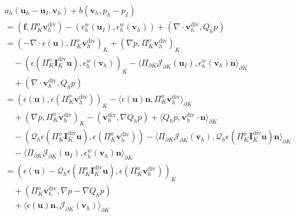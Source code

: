 \documentclass[review,hidelinks,onefignum,onetabnum]{siamart251216}
\begin{document}
\begin{equation}\label{eq:erroreq}
\begin{aligned}
& a_h(\boldsymbol{u}_h - \boldsymbol{u}_I, \boldsymbol{v}_h) + b(\boldsymbol{v}_h, p_h - p_I) \\
&= (\boldsymbol{f}, \Pi_K^o \boldsymbol{v}_h^{\operatorname{div}}) 
  - (\epsilon_h^w(\boldsymbol{u}_I), \epsilon_h^w(\boldsymbol{v}_h)) 
  + (\nabla \cdot \boldsymbol{v}_h^{\operatorname{div}}, Q_h p) \\
&= (-\nabla \cdot \epsilon(\boldsymbol{u}), \Pi_K^o \boldsymbol{v}_h^{\operatorname{div}})_K 
  + (\nabla p, \Pi_K^o \boldsymbol{v}_h^{\operatorname{div}})_K \\
&\quad - (\epsilon(\Pi_K^o \boldsymbol{I}_K^{\operatorname{div}} \boldsymbol{u}), \epsilon_h^w(\boldsymbol{v}_h))_K 
  - \langle \Pi_{\partial K} \mathcal{J}_{\partial K}(\boldsymbol{u}_I), \epsilon_h^w(\boldsymbol{v}_h)\boldsymbol{n} \rangle_{\partial K} \\
&\quad + (\nabla \cdot \boldsymbol{v}_h^{\operatorname{div}}, Q_h p) \\
&= (\epsilon(\boldsymbol{u}), \epsilon(\Pi_K^o \boldsymbol{v}_h^{\operatorname{div}}))_K 
  - \langle \epsilon(\boldsymbol{u})\boldsymbol{n}, \Pi_K^o \boldsymbol{v}_h^{\operatorname{div}} \rangle_{\partial K} \\
&\quad + (\nabla p, \Pi_K^o \boldsymbol{v}_h^{\operatorname{div}})_K 
  - (\boldsymbol{v}_h^{\operatorname{div}}, \nabla Q_h p) 
  + \langle Q_h p, \boldsymbol{v}_h^{\operatorname{div}} \cdot \boldsymbol{n} \rangle_{\partial K} \\
&\quad - (\mathcal{Q}_h \epsilon(\Pi_K^o \boldsymbol{I}_K^{\operatorname{div}} \boldsymbol{u}), \epsilon(\Pi_K^o \boldsymbol{v}_h^{\operatorname{div}})) 
  - \langle \Pi_{\partial K} \mathcal{J}_{\partial K}(\boldsymbol{v}_h), \mathcal{Q}_h \epsilon(\Pi_K^o \boldsymbol{I}_K^{\operatorname{div}} \boldsymbol{u})\boldsymbol{n} \rangle_{\partial K} \\
&\quad - \langle \Pi_{\partial K} \mathcal{J}_{\partial K}(\boldsymbol{u}_I), \epsilon_h^w(\boldsymbol{v}_h)\boldsymbol{n} \rangle_{\partial K} \\
&= (\epsilon(\boldsymbol{u}) - \mathcal{Q}_h \epsilon(\Pi_K^o \boldsymbol{I}_K^{\operatorname{div}} \boldsymbol{u}), \epsilon(\Pi_K^o \boldsymbol{v}_h^{\operatorname{div}}))_K \\
&\quad + (\Pi_K^o \boldsymbol{v}_h^{\operatorname{div}}, \nabla p - \nabla Q_h p) \\
&\quad + \langle \epsilon(\boldsymbol{u})\boldsymbol{n}, \mathcal{J}_{\partial K}(\boldsymbol{v}_h) \rangle_{\partial K} 

\end{aligned}
\end{equation}
\end{document}
